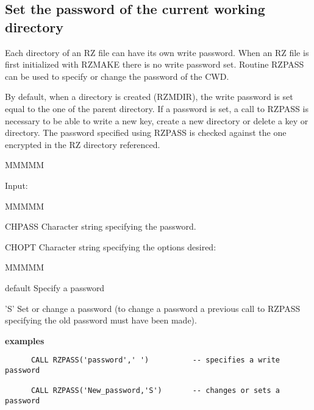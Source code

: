 \subsection{Set the password of the current working directory}
\par Each directory of an RZ file can have its own write password.
When an RZ file is first initialized with RZMAKE there is
no write password set.
Routine RZPASS can be used to specify
or change the password of the CWD.
\par By default, when a directory is created (RZMDIR), the write
password is set equal to the one of the parent directory.
If a password is set, a call to RZPASS is necessary to be able
to write a new key, create a new directory or delete a key or directory.
The password specified using RZPASS is
checked against the one encrypted in the RZ directory referenced.
\begin{DL}{MMMMM}
\item[Input:
]
\begin{DL}{MMMMM}
\item[CHPASS
]Character string specifying the password.
\item[CHOPT
]Character string specifying the options desired:
\begin{DL}{MMMMM}
\item[default
]Specify a password
\item['S'
]Set or change a password (to change a password a previous call to
RZPASS specifying the old password must have been made).
\end{DL}
\end{DL}
\end{DL}
\par {\bf examples}
\begin{verbatim}
      CALL RZPASS('password',' ')          -- specifies a write password
 
      CALL RZPASS('New_password,'S')       -- changes or sets a password
\end{verbatim}
